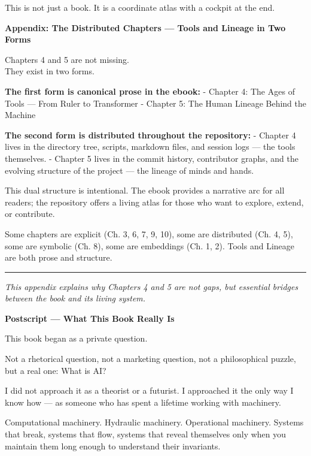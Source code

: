 \documentclass[
]{article}
\begin{document}
This is not just a book. It is a coordinate atlas with a cockpit at the
end.

\newpage
\vspace*{2cm}

\noindent\textbf{\large Appendix: The Distributed Chapters — Tools and Lineage in Two Forms}

Chapters 4 and 5 are not missing.\\
They exist in two forms.

\textbf{The first form is canonical prose in the ebook:} - Chapter 4:
The Ages of Tools --- From Ruler to Transformer - Chapter 5: The Human
Lineage Behind the Machine

\textbf{The second form is distributed throughout the repository:} -
Chapter 4 lives in the directory tree, scripts, markdown files, and
session logs --- the tools themselves. - Chapter 5 lives in the commit
history, contributor graphs, and the evolving structure of the project
--- the lineage of minds and hands.

This dual structure is intentional. The ebook provides a narrative arc
for all readers; the repository offers a living atlas for those who want
to explore, extend, or contribute.

Some chapters are explicit (Ch. 3, 6, 7, 9, 10), some are distributed
(Ch. 4, 5), some are symbolic (Ch. 8), some are embeddings (Ch. 1, 2).
Tools and Lineage are both prose and structure.

\begin{center}\rule{0.5\linewidth}{0.5pt}\end{center}

\emph{This appendix explains why Chapters 4 and 5 are not gaps, but
essential bridges between the book and its living system.}

\newpage
\vspace*{4cm}
\begin{center}
{\large\textbf{Postscript — What This Book Really Is}}
\end{center}

This book began as a private question.

Not a rhetorical question, not a marketing question, not a philosophical
puzzle, but a real one: What is AI?

I did not approach it as a theorist or a futurist. I approached it the
only way I know how --- as someone who has spent a lifetime working with
machinery.

Computational machinery. Hydraulic machinery. Operational machinery.
Systems that break, systems that flow, systems that reveal themselves
only when you maintain them long enough to understand their invariants.
\end{document}
